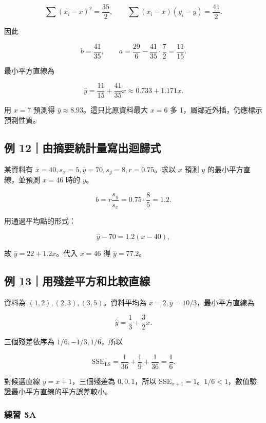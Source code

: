 \documentclass[11pt,a4paper]{article}
\begin{document}
\[
\sum(x_i-\bar x)^2=\frac{35}{2},
\qquad
\sum(x_i-\bar x)(y_i-\bar y)=\frac{41}{2}.
\]

因此

\[
b=\frac{41}{35},
\qquad
a=\frac{29}{6}-\frac{41}{35}\cdot\frac72=\frac{11}{15}.
\]

最小平方直線為

\[
\boxed{\hat y=\frac{11}{15}+\frac{41}{35}x}
\approx0.733+1.171x.
\]

用 \(x=7\) 預測得 \(\hat y\approx8.93\)。這只比原資料最大 \(x=6\) 多 1，屬鄰近外插，仍應標示預測性質。

\subsection{例 12｜由摘要統計量寫出迴歸式}\label{ux4f8b-12ux7531ux6458ux8981ux7d71ux8a08ux91cfux5bebux51faux8ff4ux6b78ux5f0f}

某資料有 \(\bar x=40,s_x=5,\bar y=70,s_y=8,r=0.75\)。求以 \(x\) 預測 \(y\) 的最小平方直線，並預測 \(x=46\) 時的 \(y\)。

\[
b=r\frac{s_y}{s_x}=0.75\cdot\frac85=1.2.
\]

用通過平均點的形式：

\[
\hat y-70=1.2(x-40),
\]

故 \(\boxed{\hat y=22+1.2x}\)。代入 \(x=46\) 得 \(\hat y=\boxed{77.2}\)。

\subsection{例 13｜用殘差平方和比較直線}\label{ux4f8b-13ux7528ux6b98ux5deeux5e73ux65b9ux548cux6bd4ux8f03ux76f4ux7dda}

資料為 \((1,2),(2,3),(3,5)\)。資料平均為 \(\bar x=2,\bar y=10/3\)，最小平方直線為

\[
\hat y=\frac13+\frac32x.
\]

三個殘差依序為 \(1/6,-1/3,1/6\)，所以

\[
\mathrm{SSE}_{\mathrm{LS}}=\frac1{36}+\frac19+\frac1{36}=\frac16.
\]

對候選直線 \(y=x+1\)，三個殘差為 \(0,0,1\)，所以 \(\mathrm{SSE}_{x+1}=1\)。\(1/6<1\)，數值驗證最小平方直線的平方誤差較小。

\subsubsection{練習 5A}\label{ux7df4ux7fd2-5a}
\end{document}
